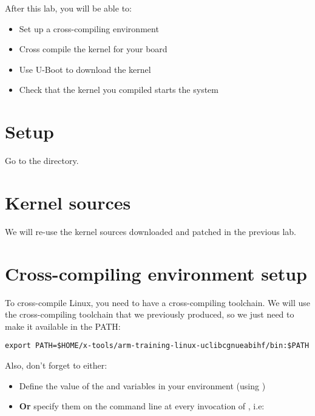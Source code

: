 
After this lab, you will be able to:
\begin{itemize}
\item Set up a cross-compiling environment
\item Cross compile the kernel for your board
\item Use U-Boot to download the kernel
\item Check that the kernel you compiled starts the system
\end{itemize}

\section{Setup}

Go to the  directory.

\section{Kernel sources}

We will re-use the kernel sources downloaded and patched in the
previous lab.

\section{Cross-compiling environment setup}

To cross-compile Linux, you need to have a cross-compiling
toolchain. We will use the cross-compiling toolchain that we
previously produced, so we just need to make it available in the PATH:

\begin{verbatim}
export PATH=$HOME/x-tools/arm-training-linux-uclibcgnueabihf/bin:$PATH
\end{verbatim}

Also, don't forget to either:

\begin{itemize}
\item Define the value of the  and 
  variables in your environment (using )
\item {\bf Or} specify them on the command line at every invocation of
  , i.e: 
\end{itemize}

